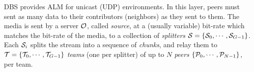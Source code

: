 DBS provides ALM for unicast (UDP) environments. {\color{red} In this
  layer, peers must sent as many data to their contributors
  (neighbors) as they sent to them.} The media is sent by a server
${\cal O}$, called \emph{source}, at a (usually variable) bit-rate
which matches the bit-rate of the media, to a collection of
\emph{splitters} ${\cal S}=\{{\cal S}_0, \cdots, {\cal
  S}_{G-1}\}$. Each ${\cal S}_i$ splits the stream into a sequence of
\emph{chunks}, and relay them to ${\cal T}=\{{\cal T}_0,\cdots,{\cal
  T}_{G-1}\}$ \emph{teams} (one per splitter) of up to $N$
\emph{peers} $\{{\cal P}_0,\cdots,{\cal P}_{N-1}\}$, per team.
